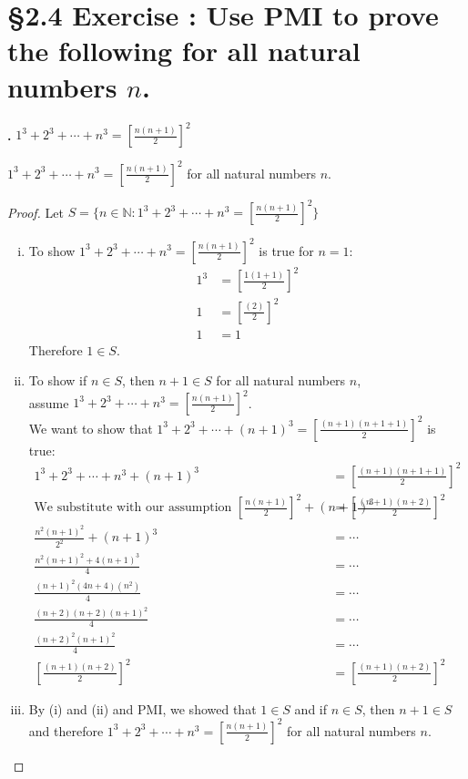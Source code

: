 \documentclass[a4paper,11pt]{article}
\begin{document}
\setcounter{SubsectionCounter}{5}
\section*{\S 2.4 Exercise : Use PMI to prove the following for all natural numbers \(n\).}
\textbf{.}
\(1^3 + 2^3 + \cdots + n^3 = \left[\frac{n{(n+1)}}{2}\right]^2 \)
\begin{theorem1}
  \(1^3 + 2^3 + \cdots + n^3 = \left[\frac{n{(n+1)}}{2}\right]^2 \) for all natural numbers \(n\).
\begin{proof}
  Let \(S = \{n \in \mathbb{N}: 1^3 + 2^3 + \cdots + n^3 = \left[\frac{n{(n+1)}}{2}\right]^2 \}\)\\
  \begin{enumerate}[(i)]
    \item  To show \(1^3 + 2^3 + \cdots + n^3 = \left[\frac{n{(n+1)}}{2}\right]^2\) is true for 
    \(n=1\):
    \begin{align*}
    1^3 &= \left[\frac{1{(1+1)}}{2}\right]^2\\
    1 &= \left[\frac{{(2)}}{2}\right]^2\\
    1 &= 1
    \end{align*}
    Therefore \(1 \in S\).
    \newpage
    \item To show if \(n \in S\), then \(n+1 \in S\) for all natural numbers \(n\),\\
     assume \(1^3 + 2^3 + \cdots + n^3 = \left[\frac{n{(n+1)}}{2}\right]^2 \).\\
     We want to show that \(1^3 + 2^3 + \cdots + {(n+1)}^3 = \left[\frac{{(n+1)}{(n+1+1)}}{2}\right]^2\) 
    is true:
    \begin{align*}
    1^3 + 2^3 + \cdots + n^3 + {(n+1)^3} &= \left[\frac{{(n+1)}{(n+1+1)}}{2}\right]^2\\
    \text{We substitute with our assumption }\left[\frac{n{(n+1)}}{2}\right]^2 + {(n+1)}^3 &= \left[\frac{{(n+1)}{(n+2)}}{2}\right]^2\\
    \frac{n^2{(n+1)^2}}{2^2} + {(n+1)}^3 &= \cdots\\
    \frac{n^2{(n+1)^2}+4{(n+1)}^3}{4} &= \cdots\\
    \frac{{(n+1)}^2{(4n+4)}{(n^2)}}{4} &= \cdots\\
    \frac{{(n+2)}{(n+2)}{(n+1)}^2}{4} &= \cdots\\
    \frac{{(n+2)}^2{(n+1)}^2}{4} &= \cdots\\
    \left[\frac{{(n+1)}{(n+2)}}{2}\right]^2 &= \left[\frac{{(n+1)}{(n+2)}}{2}\right]^2
    \end{align*}
    \item By {(i)} and {(ii)} and PMI, we showed that \(1 \in S\) and if \(n \in S\), then \(n+1 \in S\) 
    and therefore \(1^3 + 2^3 + \cdots + n^3 = \left[\frac{n{(n+1)}}{2}\right]^2 \) for all natural numbers \(n\).
\end{enumerate}
\end{proof} 
\end{theorem1}
\end{document}

